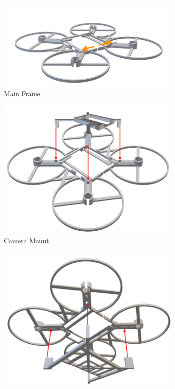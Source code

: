 \begin{manualblock}
\begin{figure}[H]
  \centering
  \begin{subfigure}[b]{0.48\linewidth}
    \centering
    \includegraphics[width=\linewidth]{img/manual/assemb1.png}
    \caption{Main Frame}
  \end{subfigure}
  \hfill
  \begin{subfigure}[b]{0.44\linewidth}
    \centering
    \includegraphics[width=\linewidth]{img/assembly-6.png}
    \caption{Camera Mount}
  \end{subfigure}
  \begin{subfigure}[b]{0.44\linewidth}
    \centering
    \includegraphics[width=\linewidth]{img/assembly-8.png}

\end{subfigure}
\end{figure}
\end{manualblock}

